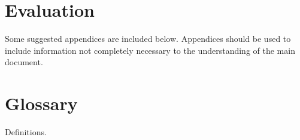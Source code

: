 \documentclass{l3deliverable}
\begin{document}
\section{Evaluation}


\appendix

Some suggested appendices are included below. Appendices should be
used to include information not completely necessary to the
understanding of the main document.


\section{Glossary}

Definitions.

\end{document}
